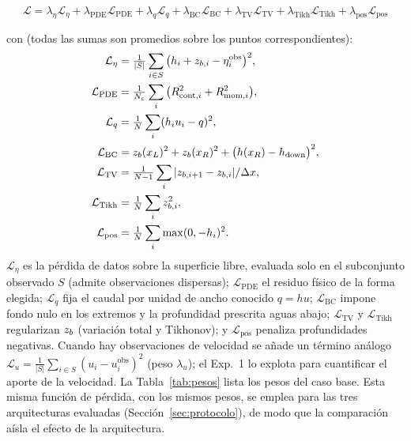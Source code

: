 \begin{equation}
  \mathcal{L} = \lambda_{\eta}\mathcal{L}_{\eta}
              + \lambda_{\text{PDE}}\mathcal{L}_{\text{PDE}}
              + \lambda_q \mathcal{L}_q
              + \lambda_{\text{BC}}\mathcal{L}_{\text{BC}}
              + \lambda_{\text{TV}}\mathcal{L}_{\text{TV}}
              + \lambda_{\text{Tikh}}\mathcal{L}_{\text{Tikh}}
              + \lambda_{\text{pos}}\mathcal{L}_{\text{pos}}
  \label{eq:loss}
\end{equation}

con (todas las sumas son promedios sobre los puntos correspondientes):
\begin{align*}
  \mathcal{L}_{\eta}       &= \tfrac{1}{|S|}\sum_{i\in S}
                              \big(h_i + z_{b,i} - \eta^{\text{obs}}_i\big)^2, \\
  \mathcal{L}_{\text{PDE}}  &= \tfrac{1}{N_c}\sum_i
                              \big(R_{\text{cont},i}^2 + R_{\text{mom},i}^2\big), \\
  \mathcal{L}_q            &= \tfrac{1}{N}\sum_i (h_i u_i - q)^2, \\
  \mathcal{L}_{\text{BC}}   &= z_b(x_L)^2 + z_b(x_R)^2
                              + \big(h(x_R)-h_{\text{down}}\big)^2, \\
  \mathcal{L}_{\text{TV}}   &= \tfrac{1}{N-1}\sum_i |z_{b,i+1}-z_{b,i}|/\Delta x, \\
  \mathcal{L}_{\text{Tikh}} &= \tfrac{1}{N}\sum_i z_{b,i}^2, \\
  \mathcal{L}_{\text{pos}}  &= \tfrac{1}{N}\sum_i \max(0,-h_i)^2 .
\end{align*}
$\mathcal{L}_\eta$ es la pérdida de datos sobre la superficie libre, evaluada
solo en el subconjunto observado $S$ (admite observaciones dispersas);
$\mathcal{L}_{\text{PDE}}$ el residuo físico de la forma elegida;
$\mathcal{L}_q$ fija el caudal por unidad de ancho conocido $q = hu$;
$\mathcal{L}_{\text{BC}}$ impone fondo nulo en los extremos y la profundidad
prescrita aguas abajo; $\mathcal{L}_{\text{TV}}$ y $\mathcal{L}_{\text{Tikh}}$
regularizan $z_b$ (variación total y Tikhonov); y $\mathcal{L}_{\text{pos}}$
penaliza profundidades negativas. Cuando hay observaciones de velocidad se
añade un término análogo $\mathcal{L}_u = \tfrac{1}{|S|}\sum_{i\in S}
(u_i-u^{\text{obs}}_i)^2$ (peso $\lambda_u$); el Exp.~1 lo explota para
cuantificar el aporte de la velocidad. La Tabla~\ref{tab:pesos} lista los
pesos del caso base. Esta misma función de pérdida, con los mismos pesos, se
emplea para las tres arquitecturas evaluadas (Sección~\ref{sec:protocolo}), de
modo que la comparación aísla el efecto de la arquitectura.


